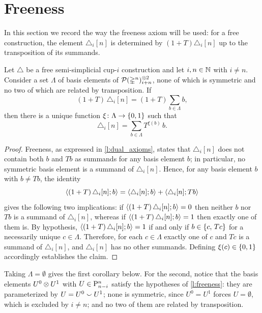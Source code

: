 
\section{Freeness}\label{s:freeness}

In this section we record the way the freeness axiom will be used: for a free construction, the element $\triangle_i[n]$ is determined by $(1+T)\triangle_i[n]$ up to the transposition of its summands.

\begin{lemma}\label{l:freeness}
	Let $\triangle$ be a free semi-simplicial \mbox{cup-$i$} construction and let $i, n \in \N$ with $i \neq n$.
	Consider a set $\Lambda$ of basis elements of $\cP(\simplex^n)^{\ot 2}_{i+n}$, none of which is symmetric and no two of which are related by transposition.
	If
	\[
	(1+T)\, \triangle_i[n] = (1+T) \sum_{b \in \Lambda} b,
	\]
	then there is a unique function $\xi \colon \Lambda \to \set{0,1}$ such that
	\[
	\triangle_i[n] = \sum_{b \in \Lambda} T^{\xi(b)}\, b.
	\]
\end{lemma}

\begin{proof}
	Freeness, as expressed in \cref{l:dual_axioms}, states that $\triangle_i[n]$ does not contain both $b$ and $Tb$ as summands for any basis element $b$; in particular, no symmetric basis element is a summand of $\triangle_i[n]$.
	Hence, for any basis element $b$ with $b \neq Tb$, the identity
	\[
	\coeff{(1+T)\,\triangle_i[n]}{b} = \coeff{\triangle_i[n]}{b} + \coeff{\triangle_i[n]}{Tb}
	\]
	gives the following two implications:
	if $\coeff{(1+T)\,\triangle_i[n]}{b} = 0$ then neither $b$ nor $Tb$ is a summand of $\triangle_i[n]$, whereas if $\coeff{(1+T)\,\triangle_i[n]}{b} = 1$ then exactly one of them is.
	By hypothesis, $\coeff{(1+T)\,\triangle_i[n]}{b} = 1$ if and only if $b \in \set{c,\, T c}$ for a necessarily unique $c \in \Lambda$.
	Therefore, for each $c \in \Lambda$ exactly one of $c$ and $T c$ is a summand of $\triangle_i[n]$, and $\triangle_i[n]$ has no other summands.
	Defining $\xi(c) \in \set{0,1}$ accordingly establishes the claim.
\end{proof}

Taking $\Lambda = \emptyset$ gives the first corollary below.
For the second, notice that the basis elements $U^0 \ot U^1$ with $U \in \P^n_{n-i}$ satisfy the hypotheses of \cref{l:freeness}: they are parameterized by $U = U^0 \union U^1$; none is symmetric, since $U^0 = U^1$ forces $U = \emptyset$, which is excluded by $i \neq n$; and no two of them are related by transposition.

